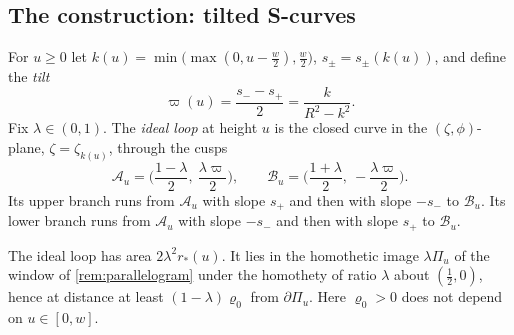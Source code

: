 \subsection{The construction: tilted S-curves}\label{sec:construction}

For $u\ge0$ let $k(u)=\min\big(\max(0,u-\tfrac w2),\tfrac w2\big)$, $s_\pm=s_\pm(k(u))$, and define the \emph{tilt}
\[
  \varpi(u)=\frac{s_--s_+}2=\frac{k}{R^2-k^2}.
\]
Fix $\lambda\in(0,1)$.
The \emph{ideal loop} at height $u$ is the closed curve in the $(\zeta,\phi)$-plane, $\zeta=\zeta_{k(u)}$, through the cusps
\[
  \mathcal A_u=\Big(\frac{1-\lambda}2,\ \frac{\lambda\varpi}2\Big),\qquad \mathcal B_u=\Big(\frac{1+\lambda}2,\ -\frac{\lambda\varpi}2\Big).
\]
Its upper branch runs from $\mathcal A_u$ with slope $s_+$ and then with slope $-s_-$ to $\mathcal B_u$.
Its lower branch runs from $\mathcal A_u$ with slope $-s_-$ and then with slope $s_+$ to $\mathcal B_u$.

\begin{lemma}\label{lem:loop}
The ideal loop has area $2\lambda^2r_*(u)$.
It lies in the homothetic image $\lambda\Pi_u$ of the window of \cref{rem:parallelogram} under the homothety of ratio $\lambda$ about $(\frac12,0)$, hence at distance at least $(1-\lambda)\varrho_0$ from $\partial\Pi_u$.
Here $\varrho_0>0$ does not depend on $u\in[0,w]$.
\end{lemma}

